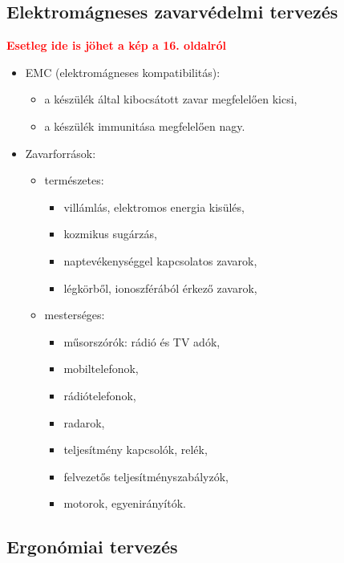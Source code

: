 \documentclass[11pt]{article}
\begin{document}
		\subsection{Elektromágneses zavarvédelmi tervezés}

			\textbf{\textcolor{red}{Esetleg ide is jöhet a kép a 16. oldalról}}

			\begin{itemize}
				\item EMC (elektromágneses kompatibilitás):
				\begin{itemize}
					\item a készülék által kibocsátott zavar megfelelően kicsi, 
					\item a készülék immunitása megfelelően nagy.
				\end{itemize}
				\item Zavarforrások:
				\begin{itemize}
					\item természetes:
					\begin{itemize}
						\item villámlás, elektromos energia kisülés,
						\item kozmikus sugárzás,
						\item naptevékenységgel kapcsolatos zavarok, 
						\item légkörből, ionoszférából érkező zavarok,
					\end{itemize}
					\item mesterséges:
					\begin{itemize}
						\item műsorszórók: rádió és TV adók,
						\item mobiltelefonok,
						\item rádiótelefonok,
						\item radarok,
						\item teljesítmény kapcsolók, relék,
						\item felvezetős teljesítményszabályzók,
						\item motorok, egyenirányítók.
					\end{itemize} 
				\end{itemize}
			\end{itemize}

		\subsection{Ergonómiai tervezés}
\end{document}
